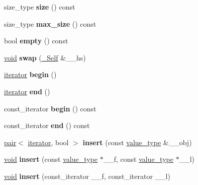 \begin{DoxyCompactItemize}
size\+\_\+type {\bfseries size} () const
\item 
\mbox{\label{classhash__map_a0385800c43592b864af10d7ef192d583}} 
size\+\_\+type {\bfseries max\+\_\+size} () const
\item 
\mbox{\label{classhash__map_a98a01c0b16de09c1c6457ebf3d638844}} 
bool {\bfseries empty} () const
\item 
\mbox{\label{classhash__map_acfc7e4ccc996206295f79c4dcfa2f37d}} 
\hyperlink{interfacevoid}{void} {\bfseries swap} (\hyperlink{classhash__map}{\+\_\+\+Self} \&\+\_\+\+\_\+hs)
\item 
\mbox{\label{classhash__map_a6062634f7846ff2392cc8a4a1459ea91}} 
\hyperlink{structiterator}{iterator} {\bfseries begin} ()
\item 
\mbox{\label{classhash__map_a27b5835226bd940e16ca4dc0bbc57dc4}} 
\hyperlink{structiterator}{iterator} {\bfseries end} ()
\item 
\mbox{\label{classhash__map_ae3363bcc090d9bdf786fc67a1bd1d6b1}} 
const\+\_\+iterator {\bfseries begin} () const
\item 
\mbox{\label{classhash__map_aa22e45a7c1cc2395924d26ec8851a952}} 
const\+\_\+iterator {\bfseries end} () const
\item 
\mbox{\label{classhash__map_a67af5faba349ad51bfee0df2e2414578}} 
\hyperlink{structpair}{pair}$<$ \hyperlink{structiterator}{iterator}, bool $>$ {\bfseries insert} (const \hyperlink{structpair}{value\+\_\+type} \&\+\_\+\+\_\+obj)
\item 
\mbox{\label{classhash__map_a39f052045bb974380cb17bc9f7885007}} 
\hyperlink{interfacevoid}{void} {\bfseries insert} (const \hyperlink{structpair}{value\+\_\+type} $\ast$\+\_\+\+\_\+f, const \hyperlink{structpair}{value\+\_\+type} $\ast$\+\_\+\+\_\+l)
\item 
\mbox{\label{classhash__map_a26cbf96ad67bc8d41ab5cb0f9d1af145}} 
\hyperlink{interfacevoid}{void} {\bfseries insert} (const\+\_\+iterator \+\_\+\+\_\+f, const\+\_\+iterator \+\_\+\+\_\+l)

\end{DoxyCompactItemize}

